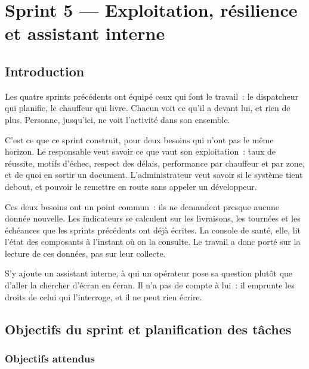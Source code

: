 %
\chapter{Sprint 5 — Exploitation, résilience et assistant interne}
\label{ch:ops}

\section{Introduction}

Les quatre sprints précédents ont équipé ceux qui font le travail~: le dispatcheur qui planifie, le
chauffeur qui livre. Chacun voit ce qu'il a devant lui, et rien de plus. Personne, jusqu'ici, ne voit
l'activité dans son ensemble.

C'est ce que ce sprint construit, pour deux besoins qui n'ont pas le même horizon. Le responsable veut
savoir ce que vaut son exploitation~: taux de réussite, motifs d'échec, respect des délais,
performance par chauffeur et par zone, et de quoi en sortir un document. L'administrateur veut savoir
si le système tient debout, et pouvoir le remettre en route sans appeler un développeur.

Ces deux besoins ont un point commun~: ils ne demandent presque aucune donnée nouvelle. Les
indicateurs se calculent sur les livraisons, les tournées et les échéances que les sprints précédents
ont déjà écrites. La console de santé, elle, lit l'état des composants à l'instant où on la
consulte. Le travail a donc porté sur la lecture de ces données, pas sur leur collecte.

S'y ajoute un assistant interne, à qui un opérateur pose sa question plutôt que d'aller la chercher
d'écran en écran. Il n'a pas de compte à lui~: il emprunte les droits de celui qui l'interroge, et il
ne peut rien écrire.

\section{Objectifs du sprint et planification des tâches}

\subsection{Objectifs attendus}

